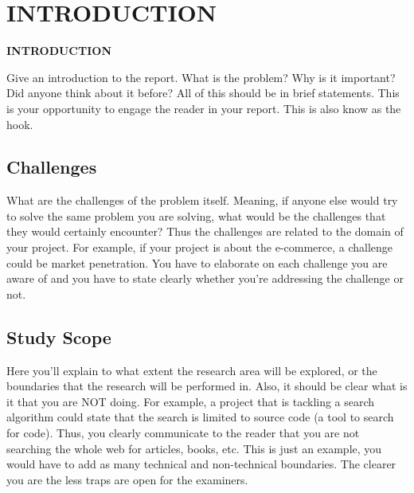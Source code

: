 \chapter{INTRODUCTION}
\pagebreak

\begin{center}
{\LARGE\textbf{INTRODUCTION}}
\end{center}

Give an introduction to the report. What is the problem? Why is it important? Did anyone think about it before? All of this should be in brief statements. This is your opportunity to engage the reader in your report. This is also know as the hook.

\section{Challenges}
\label{sec:challenges}

What are the challenges of the problem itself. Meaning, if anyone else would try to solve the same problem you are solving, what would be the challenges that they would certainly encounter? Thus the challenges are related to the domain of your project. For example, if your project is about the e-commerce, a challenge could be market penetration. You have to elaborate on each challenge you are aware of and you have to state clearly whether you're addressing the challenge or not. 


\section{Study Scope}
\label{sec:study_scope}

Here you'll explain to what extent the research area will be explored, or the boundaries that the research will be performed in. Also, it should be clear what is it that you are NOT doing. For example, a project that is tackling a search algorithm could state that the search is limited to source code (a tool to search for code). Thus, you clearly communicate to the reader that you are not searching the whole web for articles, books, etc. This is just an example, you would have to add as many technical and non-technical boundaries. The clearer you are the less traps are open for the examiners.

